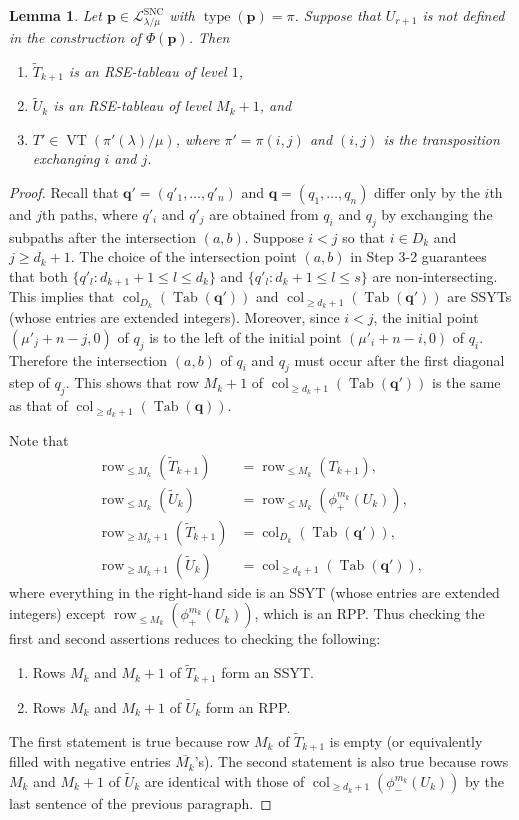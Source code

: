\documentclass{amsart}
\numberwithin{equation}{section}
\newtheorem{lem}[thm]{Lemma}
\theoremstyle{definition}
\newcommand\type{\operatorname{type}}
\newcommand\VT{\operatorname{VT}}
\newcommand\Tab{\operatorname{Tab}}
\newcommand\LL{\mathcal{L}_\lm}
\newcommand\lsnc{\LL^{\operatorname{SNC}}}
\newcommand\col{\operatorname{col}}
\newcommand\row{\operatorname{row}}
\newcommand\pd{\phi_+}
\newcommand\pu{\phi_-}
\newcommand\pp{\mathbf{p}}
\newcommand\lm{{\lambda/\mu}}
\begin{document}
\begin{lem}\label{lem:sign-reversing}
  Let $\pp\in\lsnc$ with $\type(\pp)=\pi$. Suppose that $U_{r+1}$ is not defined
  in the construction of $\Phi(\pp)$. Then
\begin{enumerate}
\item $\widetilde{T}_{k+1}$ is an RSE-tableau of level $1$, 
\item $\widetilde{U}_{k}$ is an RSE-tableau of level $M_{k}+1$, and
\item $T'\in\VT(\pi'(\lambda)/\mu)$,
where $\pi'=\pi (i,j)$ and  $(i,j)$ is the transposition exchanging
  $i$ and $j$.
\end{enumerate}

\end{lem}
\begin{proof}
  Recall that $\mathbf{q}'=(q'_1,\dots,q'_n)$ and $\mathbf{q}=(q_1,\dots,q_n)$
  differ only by the $i$th and $j$th paths, where $q'_i$ and $q'_j$ are obtained
  from $q_i$ and $q_j$ by exchanging the subpaths after the intersection
  $(a,b)$. Suppose $i<j$ so that $i\in D_k$ and $j\ge d_k+1$. The choice of the
  intersection point $(a,b)$ in Step 3-2 guarantees that both $\{q'_l:
  d_{k+1}+1\le l\le d_k\}$ and $\{q'_l: d_{k}+1\le l\le s\}$ are
  non-intersecting. This implies that $\col_{D_k}(\Tab(\mathbf{q}'))$ and
  $\col_{\ge d_k+1}(\Tab(\mathbf{q}'))$ are SSYTs (whose entries are extended
  integers). Moreover, since $i<j$, the initial point $(\mu'_j+n-j,0)$ of $q_j$
  is to the left of the initial point $(\mu'_i+n-i,0)$ of $q_i$. Therefore the
  intersection $(a,b)$ of $q_i$ and $q_j$ must occur after the first diagonal
  step of $q_j$. This shows that row $M_k+1$ of $\col_{\ge
    d_k+1}(\Tab(\mathbf{q'}))$ is the same as that of $\col_{\ge
    d_k+1}(\Tab(\mathbf{q}))$.

 Note that 
 \begin{align*}
   \row_{\le M_k}(\widetilde{T}_{k+1})&=\row_{\le M_k}(T_{k+1}),\\
   \row_{\le M_k}(\widetilde{U}_{k})&=\row_{\le M_k}(\pd^{m_k}(U_k)),\\
   \row_{\ge M_k+1}(\widetilde{T}_{k+1})&=\col_{D_k}(\Tab(\mathbf{q}')),\\
   \row_{\ge M_k+1}(\widetilde{U}_{k})&=\col_{\ge d_k+1}(\Tab(\mathbf{q}')),
 \end{align*}
 where everything in the right-hand side is an SSYT (whose entries are extended
 integers) except $\row_{\le M_k}(\pd^{m_k}(U_k))$, which is an RPP. Thus
 checking the first and second assertions reduces to checking the following:
  \begin{enumerate}
  \item Rows $M_k$ and $M_{k}+1$ of $\widetilde{T}_{k+1}$ form an SSYT.
  \item Rows $M_k$ and $M_{k}+1$ of $\widetilde{U}_{k}$ form an RPP.
  \end{enumerate}
  The first statement is true because row $M_k$ of $\widetilde{T}_{k+1}$ is
  empty (or equivalently filled with negative entries $\overline{M_k}$'s). The
  second statement is also true because rows $M_k$ and $M_k+1$ of
  $\widetilde{U}_{k}$ are identical with those of $\col_{\ge
    d_k+1}(\pu^{m_k}(U_k))$ by the last sentence of the previous paragraph.


\end{proof}
\end{document}
